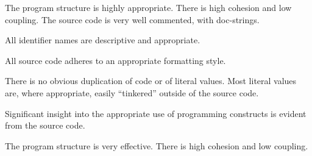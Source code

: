 \documentclass{../../fal_assignment}
\begin{document}
\begin{markingrubric}
             \par The program structure is highly appropriate. There is high cohesion and low coupling.
        \grade The source code is very well commented, with doc-strings.
            \par All identifier names are descriptive and appropriate.
            \par All source code adheres to an appropriate formatting style.
             \par There is no obvious duplication of code or of literal values. Most literal values are, where appropriate, easily ``tinkered'' outside of the source code.  
             \par Significant insight into the appropriate use of programming constructs is evident from the source code.
             \par The program structure is very effective. There is high cohesion and low coupling.	
\end{markingrubric}
\end{document}
